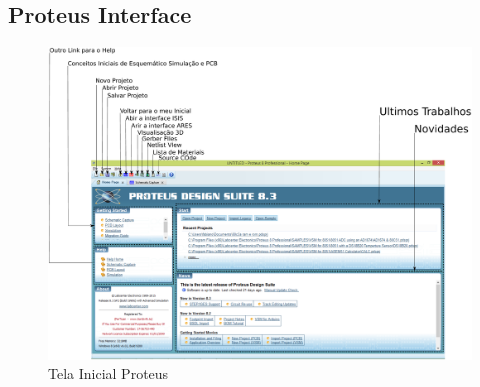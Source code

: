 \documentclass{Fabiano_file}
\begin{document}
\pagebreak

\subsection{Proteus Interface}
\begin{figure}[h!]
\centering
\includegraphics[width=1\textwidth]{Tela_Inicial.pdf}
\caption{Tela Inicial Proteus}
\label{fig:Tela_Inicial}
\end{figure}
\end{document}
